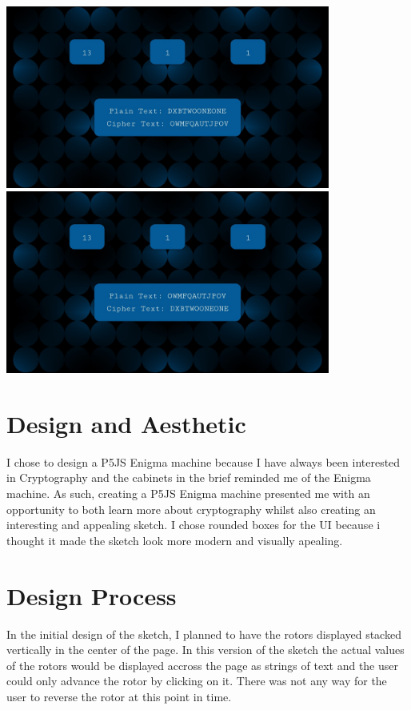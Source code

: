 \documentclass[12pt,a4paper]{article}
\begin{document}
		\begin{center}
			\includegraphics[width=0.8\textwidth]{figures/figure1.jpg}\\
			\vspace{0.5cm}
			\includegraphics[width=0.8\textwidth]{figures/figure2.jpg}\\
		\end{center}
	
	\newpage

	\section{Design and Aesthetic}
		I chose to design a P5JS Enigma machine because I have always been interested 
		in Cryptography and the cabinets in the brief reminded me of the Enigma machine. 
		As such, creating a P5JS Enigma machine presented me with an opportunity to 
		both learn more about cryptography whilst also creating an interesting and appealing 
		sketch. I chose rounded boxes for the UI because i thought it made the sketch look 
		more modern and visually apealing.\\

	\section{Design Process}
		In the initial design of the sketch, I planned to have the rotors displayed stacked 
		vertically in the center of the page. In this version of the sketch the actual values 
		of the rotors would be displayed accross the page as strings of text and the user could
		only advance the rotor by clicking on it. There was not any way for the user to reverse 
		the rotor at this point in time.\\
\end{document}

